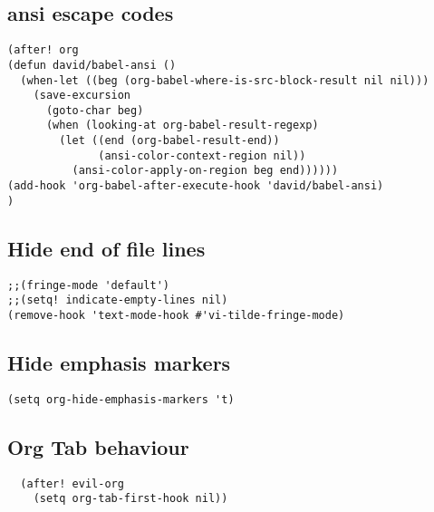 \documentclass{assignments}
\begin{document}
\subsection*{ansi escape codes}
\label{sec:org943e50a}
\begin{verbatim}
(after! org
(defun david/babel-ansi ()
  (when-let ((beg (org-babel-where-is-src-block-result nil nil)))
    (save-excursion
      (goto-char beg)
      (when (looking-at org-babel-result-regexp)
        (let ((end (org-babel-result-end))
              (ansi-color-context-region nil))
          (ansi-color-apply-on-region beg end))))))
(add-hook 'org-babel-after-execute-hook 'david/babel-ansi)
)
\end{verbatim}

\subsection*{Hide end of file lines}
\label{sec:org752197e}
\begin{verbatim}
;;(fringe-mode 'default')
;;(setq! indicate-empty-lines nil)
(remove-hook 'text-mode-hook #'vi-tilde-fringe-mode)
\end{verbatim}

\subsection*{Hide emphasis markers}
\label{sec:org07307dd}
\begin{verbatim}
(setq org-hide-emphasis-markers 't)
\end{verbatim}
\subsection*{Org Tab behaviour}
\label{sec:orge35615c}
\begin{verbatim}
  (after! evil-org
    (setq org-tab-first-hook nil))
\end{verbatim}
\end{document}
